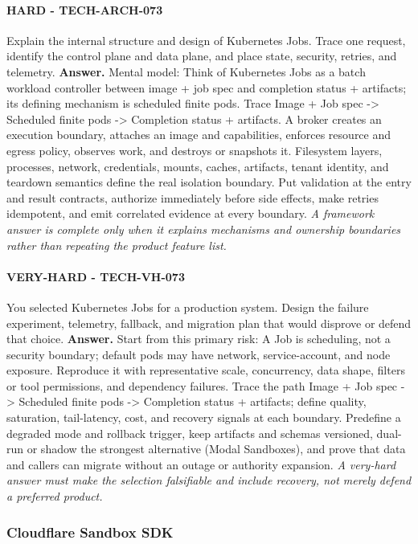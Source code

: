 \paragraph{HARD - TECH-ARCH-073} Explain the internal structure and design of Kubernetes Jobs. Trace one request, identify the control plane and data plane, and place state, security, retries, and telemetry.
\textbf{Answer.} Mental model: Think of Kubernetes Jobs as a batch workload controller between image + job spec and completion status + artifacts; its defining mechanism is scheduled finite pods. Trace Image + Job spec -> Scheduled finite pods -> Completion status + artifacts. A broker creates an execution boundary, attaches an image and capabilities, enforces resource and egress policy, observes work, and destroys or snapshots it. Filesystem layers, processes, network, credentials, mounts, caches, artifacts, tenant identity, and teardown semantics define the real isolation boundary. Put validation at the entry and result contracts, authorize immediately before side effects, make retries idempotent, and emit correlated evidence at every boundary.
\textit{A framework answer is complete only when it explains mechanisms and ownership boundaries rather than repeating the product feature list.}
\paragraph{VERY-HARD - TECH-VH-073} You selected Kubernetes Jobs for a production system. Design the failure experiment, telemetry, fallback, and migration plan that would disprove or defend that choice.
\textbf{Answer.} Start from this primary risk: A Job is scheduling, not a security boundary; default pods may have network, service-account, and node exposure. Reproduce it with representative scale, concurrency, data shape, filters or tool permissions, and dependency failures. Trace the path Image + Job spec -> Scheduled finite pods -> Completion status + artifacts; define quality, saturation, tail-latency, cost, and recovery signals at each boundary. Predefine a degraded mode and rollback trigger, keep artifacts and schemas versioned, dual-run or shadow the strongest alternative (Modal Sandboxes), and prove that data and callers can migrate without an outage or authority expansion.
\textit{A very-hard answer must make the selection falsifiable and include recovery, not merely defend a preferred product.}
\subsubsection*{Cloudflare Sandbox SDK}
